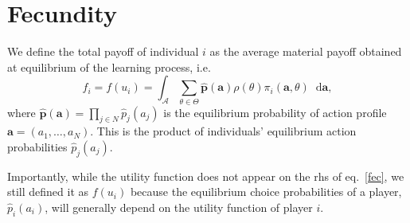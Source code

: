 \documentclass[11pt,reqno]{amsart}
\newcommand{\st}{\rho}
\newcommand{\e}{\theta}
\newcommand{\Et}{\Theta}
\newcommand{\ac}{a}
\newcommand{\Ac}{\mathcal{A}}
\newcommand{\p}{p}
\newcommand{\vp}{\mathbf{p}}
\newcommand{\de}{\mathop{}\!\mathrm{d}}
\newcommand{\va}{\mathbf{a}}
\newcommand{\pay}{\pi}
\newcommand{\np}{N}%
\newcommand{\fc}{f}
\newcommand{\pf}{u}
\begin{document}
%
%
%
%

\section{Fecundity}

We define the total payoff of individual $i$ as the average material payoff obtained at equilibrium of the learning process, i.e.
\begin{equation}
\label{fec}
\fc_{i} = \fc(\pf_i) = \int_{\Ac} \sum_{\e\in\Et} \hat{\vp}(\va) \st(\e) \pay_i(\va,\e) \de \va,
\end{equation}
where $\hat{\vp}(\va) = \prod_{j\in N} \hat{\p}_j(\ac_j)$ is the equilibrium probability of action profile $\va = (\ac_1,\dots,\ac_\np)$. This is the product of individuals' equilibrium action probabilities $\hat{\p}_j(\ac_j)$.

Importantly, while the utility function does not appear on the rhs of eq.~\ref{fec}, we still defined it as $\fc(\pf_i)$ because the equilibrium choice probabilities of a player, $\hat{\p}_i(\ac_i)$, will generally depend on the utility function of player $i$.
\end{document}
